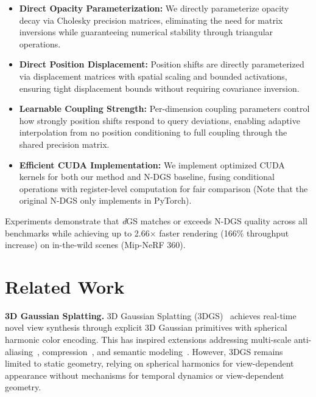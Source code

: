 \documentclass{article}
\newcommand{\modelname}{\textit{d}GS}
\theoremstyle{plain}
\theoremstyle{definition}
\theoremstyle{remark}
\begin{document}
\begin{itemize}[leftmargin=*]
\item \textbf{Direct Opacity Parameterization:} We directly parameterize opacity decay via Cholesky precision matrices, eliminating the need for matrix inversions while guaranteeing numerical stability through triangular operations.

\item \textbf{Direct Position Displacement:} Position shifts are directly parameterized via displacement matrices with spatial scaling and bounded activations, ensuring tight displacement bounds without requiring covariance inversion.

\item \textbf{Learnable Coupling Strength:} Per-dimension coupling parameters control how strongly position shifts respond to query deviations, enabling adaptive interpolation from no position conditioning to full coupling through the shared precision matrix.

\item \textbf{Efficient CUDA Implementation:} We implement optimized CUDA kernels for both our method and N-DGS baseline, fusing conditional operations with register-level computation for fair comparison (Note that the original N-DGS only implements in PyTorch).
\end{itemize}

Experiments demonstrate that \modelname{} matches or exceeds N-DGS quality across all benchmarks while achieving up to 2.66$\times$ faster rendering (166\% throughput increase) on in-the-wild scenes (Mip-NeRF 360).


\section{Related Work}
\label{sec:related_work}

\textbf{3D Gaussian Splatting.}
3D Gaussian Splatting (3DGS)~\citep{3dgs} achieves real-time novel view synthesis through explicit 3D Gaussian primitives with spherical harmonic color encoding. This has inspired extensions addressing multi-scale anti-aliasing~\citep{yu2023mipsplattingaliasfree3dgaussian,yan2024multiscale3dgaussiansplatting}, compression~\cite{lee2024compact,morgenstern2024compact}, and semantic modeling~\cite{shi2023languageembedded3dgaussians,zhou2024feature3dgssupercharging3d}. However, 3DGS remains limited to static geometry, relying on spherical harmonics for view-dependent appearance without mechanisms for temporal dynamics or view-dependent geometry.
\end{document}
